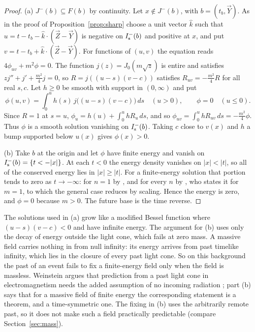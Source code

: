 \begin{proof}
(a) $J^-(b)\subseteq F(b)$ by continuity. Let $x\notin J^-(b)$, with $b=(t_b,\vec Y)$.
As in the proof of Proposition~\ref{prop:sharp} choose a unit vector $\hat k$
such that $u=t-t_b-\hat k\cdot(\vec Z-\vec Y)$ is negative on $I^-_{\mathrm s}(b)$ and positive
at $x$, and put $v=t-t_b+\hat k\cdot(\vec Z-\vec Y)$. For functions of $(u,v)$ the
equation reads $4\phi_{uv}+m^2\phi=0$. The function $j(z)=J_0(m\sqrt z)$ is entire
and satisfies $zj''+j'+\tfrac{m^2}{4}j=0$, so $R=j((u-s)(v-c))$ satisfies
$R_{uv}=-\tfrac{m^2}{4}R$ for all real $s,c$. Let $h\ge0$ be smooth with support in
$(0,\infty)$ and put
\[
\phi(u,v)=\int_0^u h(s)\,j\bigl((u-s)(v-c)\bigr)\,ds\quad(u>0),\qquad \phi=0\quad(u\le0).
\]
Since $R=1$ at $s=u$, $\phi_u=h(u)+\int_0^uhR_u\,ds$, and so
$\phi_{uv}=\int_0^uhR_{uv}\,ds=-\tfrac{m^2}{4}\phi$. Thus $\phi$ is a smooth solution
vanishing on $I^-_{\mathrm s}(b)$. Taking $c$ close to $v(x)$ and $h$ a bump supported below
$u(x)$ gives $\phi(x)>0$.

(b) Take $b$ at the origin and let $\phi$ have finite energy and vanish on
$I^-_{\mathrm s}(b)=\{t<-|x|\}$. At each $t<0$ the energy density vanishes on $|x|<|t|$, so all
of the conserved energy lies in $|x|\ge|t|$. For a finite-energy solution that
portion tends to zero as $t\to-\infty$: for $n=1$ by \citet[Theorem~1, with time
reversed]{Burnol2006}, and for every $n$ by \citet[Remark~1.10]{Yang2023}, who states it for $m=1$, to which
the general case reduces by scaling. Hence the energy is zero, and $\phi=0$ because $m>0$. The
future base is the time reverse.
\end{proof}

The solutions used in (a) grow like a modified Bessel function where
$(u-s)(v-c)<0$ and have infinite energy. The argument for (b) uses only the decay
of energy outside the light cone, which fails at zero mass.
A massive field carries nothing in from null infinity: its energy arrives from
past timelike infinity, which lies in the closure of every past light cone. So on
this background the past of an event fails to fix a finite-energy field only when
the field is massless. Weinstein argues that prediction from a past light cone in
electromagnetism needs the added assumption of no incoming radiation
\citep{Weinstein2011}; part (b) says that for a massive field of finite energy the
corresponding statement is a theorem, and a time-symmetric one. The fixing in (b)
uses the arbitrarily remote past, so it does not make such a field practically
predictable (compare Section~\ref{sec:mass}).


